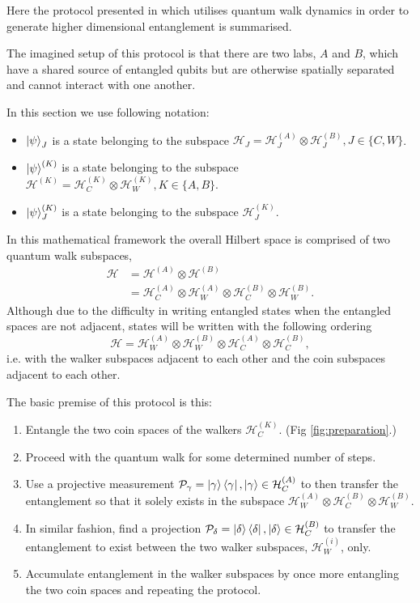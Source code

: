 Here the protocol presented in \cite{giordani2020} which utilises quantum walk dynamics in order to generate higher dimensional entanglement is summarised.

The imagined setup of this protocol is that there are two labs, $A$ and $B$, which have a shared source of entangled qubits but are otherwise spatially separated and cannot interact with one another.

In this section we use following notation:
\begin{itemize}
    \item $\ket{\psi}_J$ is a state belonging to the subspace $\mathcal{H}_J = \mathcal{H}^{(A)}_J \otimes \mathcal{H}^{(B)}_J, J\in\{C,W\}$.
    \item $\ket{\psi}^{(K)}$ is a state belonging to the subspace $\mathcal{H}^{(K)} = \mathcal{H}^{(K)}_C \otimes \mathcal{H}^{(K)}_W, K\in\{A,B\}$.
    \item  $\ket{\psi}^{(K)}_J$ is a state belonging to the subspace $\mathcal{H}^{(K)}_J$.
\end{itemize}

In this mathematical framework the overall Hilbert space is comprised of two quantum walk subspaces,
\begin{align}
    \mathcal{H} &= \mathcal{H}^{(A)} \otimes \mathcal{H}^{(B)}\\
                &= \mathcal{H}^{(A)}_C \otimes \mathcal{H}^{(A)}_W \otimes \mathcal{H}^{(B)}_C \otimes \mathcal{H}^{(B)}_W.
\end{align}
Although due to the difficulty in writing entangled states when the entangled spaces are not adjacent, states will be written with the following ordering
\begin{equation}
    \mathcal{H} = \mathcal{H}^{(A)}_W \otimes \mathcal{H}^{(B)}_W \otimes \mathcal{H}^{(A)}_C \otimes \mathcal{H}^{(B)}_C,
\end{equation} 
i.e. with the walker subspaces adjacent to each other and the coin subspaces adjacent to each other.

The basic premise of this protocol is this:
\begin{enumerate}
    \item Entangle the two coin spaces of the walkers $\mathcal{H}^{(K)}_C$. (Fig \ref{fig:preparation}.)
    \item Proceed with the quantum walk for some determined number of steps.
    \item Use a projective measurement $\mathcal{P}_\gamma = \ket{\gamma}\bra{\gamma}, \ket{\gamma}\in\mathcal{H}^{(A)}_C$ to then transfer the entanglement so that it solely exists in the subspace $\mathcal{H}^{(A)}_W \otimes \mathcal{H}^{(B)}_C \otimes \mathcal{H}^{(B)}_W$.
    \item In similar fashion, find a projection $\mathcal{P}_\delta = \ket{\delta}\bra{\delta}, \ket{\delta}\in\mathcal{H}^{(B)}_C$ to transfer the entanglement to exist between the two walker subspaces, $\mathcal{H}^{(i)}_W$, only.
    \item Accumulate entanglement in the walker subspaces by once more entangling the two coin spaces and repeating the protocol.
\end{enumerate}

